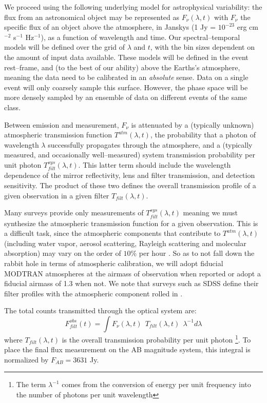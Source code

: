 We proceed using the following underlying model for astrophysical variability:
the flux from an astronomical object may be represented as $F_\nu(\lambda, t)$
with $F_\nu$ the specific flux of an object above the atmosphere, in Janskys (1
Jy = $10^{-23}$ erg cm$^{-2}$ s$^{-1}$ Hz$^{-1}$), as a function of wavelength
and time.  Our spectral--temporal models will be defined over the grid of
$\lambda$ and $t$, with the bin sizes dependent on the amount of input data
available.  These models will be defined in the event rest--frame, and (to the
best of our ability) above the Earths's atmosphere, meaning the data need to be
calibrated in an {\it absolute} sense. Data on a single event will only coarsely
sample this surface.  However, the phase space will be more densely sampled by
an ensemble of data on different events of the same class.


Between emission and measurement, $F_\nu$ is attenuated by a (typically unknown)
atmospheric transmission function $T^{atm}(\lambda, t)$, the probability that a
photon of wavelength $\lambda$ successfully propagates through the atmosphere,
and a (typically measured, and occasionally well--measured) system transmission
probability per unit photon $T^{sys}_{filt}(\lambda, t)$.  This latter term
should include the wavelength dependence of the mirror reflectivity, lens and
filter transmission, and detection sensitivity.  The product of these two
defines the overall transmission profile of a given observation in a given
filter $T_{filt}(\lambda, t)$.

Many surveys provide only measurements of $T^{sys}_{filt}(\lambda, t)$
\citep[e.g.][]{2006ApJ...646.1436S} meaning we must synthesize the atmospheric
transmission function for a given observation.  This is a difficult task, since
the atmospheric components that contribute to $T^{atm}(\lambda, t)$ (including
water vapor, aerosol scattering, Rayleigh scattering and molecular absorption)
may vary on the order of $10\%$ per hour \citep{2007PASP..119.1163S}.  So as to
not fall down the rabbit hole in terms of atmospheric calibration, we will adopt
fiducial MODTRAN atmospheres \citep{1999SPIE.3756..348B} at the airmass of
observation when reported or adopt a fiducial airmass of 1.3 when not.  We note
that surveys such as SDSS define their filter profiles with the atmospheric
component rolled in \citep{2007AJ....134..973I}.

The total counts transmitted through the optical system are: $$F^{obs}_{filt}
(t) = \int F_\nu(\lambda, t) ~~ T_{filt} (\lambda, t) ~~ \lambda^{-1} d\lambda$$
where $T_{filt}(\lambda, t)$ is the overall transmission probability per unit
photon \footnote{The term $\lambda^{-1}$ comes from the conversion of energy per
unit frequency into the number of photons per unit wavelength}. To place the
final flux measurement on the AB magnitude system, this integral is normalized
by $F_{AB} = 3631$ Jy.

